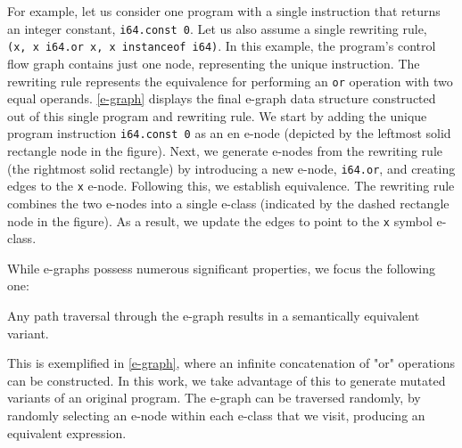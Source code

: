 \documentclass[sigplan,screen]{acmart}
\newcommand*\badge[1]{ \colorbox{red}{\color{white}#1}}
\newcommand{\todo}[1]{%
\refstepcounter{todo}
\noindent\textbf{\badge{TODO}} {\color{red}#1}
\addcontentsline{td}{todo}
{\color{red}\thesection.\thetodo\xspace #1}}
\begin{document}
For example, let us consider one program with a single instruction that returns an integer constant, \texttt{i64.const 0}. Let us also assume a single rewriting rule, \texttt{(x,\ x\ i64.or\ x, x instanceof i64)}. 
In this example, the program's control flow graph contains just one node, representing the unique instruction.
The rewriting rule represents the equivalence for performing an \texttt{or} operation with two equal operands.
\autoref{e-graph} displays the final e-graph data structure constructed out of this single program and rewriting rule. 
We start by adding the unique program instruction \texttt{i64.const 0} as an en e-node (depicted by the leftmost solid rectangle node in the figure). 
Next, we generate e-nodes from the rewriting rule (the rightmost solid rectangle) by introducing a new e-node, \texttt{i64.or}, and creating edges to the \texttt{x} e-node.
Following this, we establish equivalence. 
The rewriting rule combines the two e-nodes into a single e-class (indicated by the dashed rectangle node in the figure). 
As a result, we update the edges to point to the \texttt{x} symbol e-class.


While e-graphs possess numerous significant properties, we focus the following one:

\begin{tcolorbox}[boxrule=1pt,arc=.3em,boxsep=-1.3mm]
Any path traversal through the e-graph results in a semantically equivalent variant.
\end{tcolorbox}

This is exemplified in \autoref{e-graph}, where an infinite concatenation of "or" operations can be constructed. 
In this work, we take advantage of this to generate mutated variants of an original program. 
The e-graph can be traversed randomly, by randomly selecting an e-node within each e-class that we visit, producing an equivalent expression. 

\end{document}
